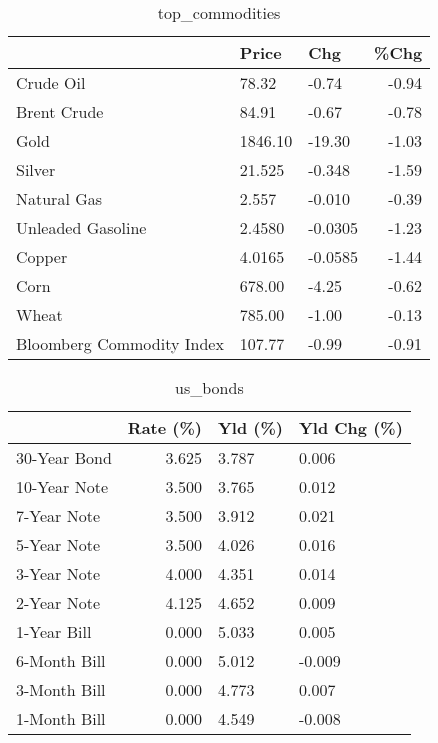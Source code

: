 \documentclass{article}%
\begin{document}
\begin{table}[htbp]%
\caption{top\_commodities}%
\centering%
\begin{adjustbox}{width=1\textwidth}%
\begin{tabular}{lllr}
\toprule
                          &   Price &     Chg &  \%Chg \\
\midrule
               Crude Oil  &   78.32 &   -0.74 & -0.94 \\
             Brent Crude  &   84.91 &   -0.67 & -0.78 \\
                    Gold  & 1846.10 &  -19.30 & -1.03 \\
                  Silver  &  21.525 &  -0.348 & -1.59 \\
             Natural Gas  &   2.557 &  -0.010 & -0.39 \\
       Unleaded Gasoline  &  2.4580 & -0.0305 & -1.23 \\
                  Copper  &  4.0165 & -0.0585 & -1.44 \\
                    Corn  &  678.00 &   -4.25 & -0.62 \\
                   Wheat  &  785.00 &   -1.00 & -0.13 \\
Bloomberg Commodity Index &  107.77 &   -0.99 & -0.91 \\
\bottomrule
\end{tabular}
%
\end{adjustbox}%
\end{table}

%


\begin{table}[htbp]%
\caption{us\_bonds}%
\centering%
\begin{adjustbox}{width=1\textwidth}%
\begin{tabular}{lrll}
\toprule
             &  Rate (\%) & Yld (\%) & Yld Chg (\%) \\
\midrule
30-Year Bond &     3.625 &   3.787 &       0.006 \\
10-Year Note &     3.500 &   3.765 &       0.012 \\
 7-Year Note &     3.500 &   3.912 &       0.021 \\
 5-Year Note &     3.500 &   4.026 &       0.016 \\
 3-Year Note &     4.000 &   4.351 &       0.014 \\
 2-Year Note &     4.125 &   4.652 &       0.009 \\
 1-Year Bill &     0.000 &   5.033 &       0.005 \\
6-Month Bill &     0.000 &   5.012 &      -0.009 \\
3-Month Bill &     0.000 &   4.773 &       0.007 \\
1-Month Bill &     0.000 &   4.549 &      -0.008 \\
\bottomrule
\end{tabular}
%
\end{adjustbox}%
\end{table}
\end{document}
